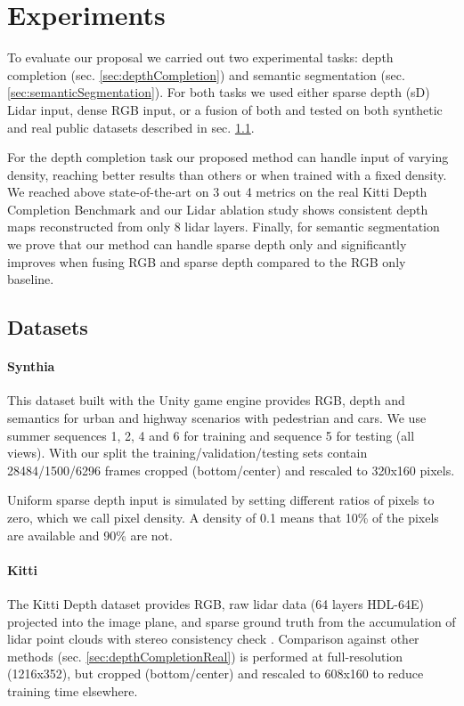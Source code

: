 \documentclass[10pt,twocolumn,letterpaper]{article}
\begin{document}
\section{Experiments}
\label{sec:experiments}

To evaluate our proposal we carried out two experimental tasks: depth completion (sec. \ref{sec:depthCompletion}) and semantic segmentation (sec. \ref{sec:semanticSegmentation}). For both tasks we used either sparse depth (sD) Lidar input, dense RGB input, or a fusion of both and tested on both synthetic and real public datasets described in sec. \ref{sec:datasets}.

For the depth completion task our proposed method can handle input of varying density, reaching better results than others or when trained with a fixed density.
We reached above state-of-the-art on 3 out 4 metrics on the real Kitti Depth Completion Benchmark and our Lidar ablation study shows consistent depth maps reconstructed from only 8 lidar layers.
Finally, for semantic segmentation we prove that our method can handle sparse depth only and significantly improves when fusing RGB and sparse depth compared to the RGB only baseline.

\subsection{Datasets}
\label{sec:datasets}

\paragraph{Synthia}
This dataset built with the Unity game engine provides RGB, depth and semantics for urban and highway scenarios \cite{Ros_2016_CVPR} with pedestrian and cars. 
We use summer sequences 1, 2, 4 and 6 for training and sequence 5 for testing (all views). With our split the training/validation/testing sets contain 28484/1500/6296 frames cropped (bottom/center) and rescaled to 320x160 pixels.

Uniform sparse depth input is simulated by setting different ratios of pixels to zero, which we call pixel density. A density of 0.1 means that 10\% of the pixels are available and 90\% are not.

\paragraph{Kitti}
The Kitti Depth dataset provides RGB, raw lidar data (64 layers HDL-64E) projected into the image plane, and sparse ground truth from the accumulation of lidar point clouds with stereo consistency check \cite{uhrig2017sparsity}.
Comparison against other methods (sec. \ref{sec:depthCompletionReal}) is performed at full-resolution (1216x352), but cropped (bottom/center) and rescaled to 608x160 to reduce training time elsewhere.
\end{document}
